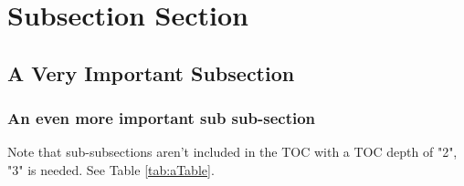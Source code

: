 \documentclass[runningheads, a4paper]{llncs}
\begin{document}
    \section{Subsection Section}

        \lipsum[4]
        
        \subsection{A Very Important Subsection}

            \lipsum[5]

            \subsubsection{An even more important sub sub-section}

                \lipsum[6]

                \vspace{-0.5cm} %
                Note that sub-subsections aren't included in the TOC with a TOC depth of "2", "3" is needed. See Table \ref{tab:aTable}.


    \newpage
    

    \printbibliography

    
\end{document}
